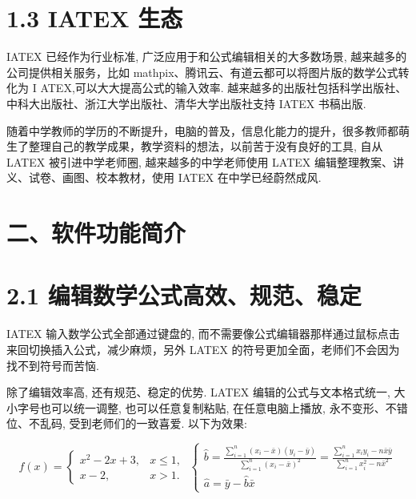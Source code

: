 \documentclass[10pt]{article}
\begin{document}
\section*{1.3 IATEX 生态}

IATEX 已经作为行业标准, 广泛应用于和公式编辑相关的大多数场景, 越来越多的公司提供相关服务，比如 mathpix、腾讯云、有道云都可以将图片版的数学公式转化为 \(\mathrm{I}\) ATEX,可以大大提高公式的输入效率. 越来越多的出版社包括科学出版社、中科大出版社、浙江大学出版社、清华大学出版社支持 IATEX 书稿出版.

随着中学教师的学历的不断提升，电脑的普及，信息化能力的提升，很多教师都萌生了整理自己的教学成果，教学资料的想法，以前苦于没有良好的工具, 自从 LATEX 被引进中学老师圈, 越来越多的中学老师使用 LATEX 编辑整理教案、讲义、试卷、画图、校本教材，使用 IATEX 在中学已经蔚然成风.

\section*{二、软件功能简介}

\section*{2.1 编辑数学公式高效、规范、稳定}

IATEX 输入数学公式全部通过键盘的, 而不需要像公式编辑器那样通过鼠标点击来回切换插入公式，减少麻烦，另外 LATEX 的符号更加全面，老师们不会因为找不到符号而苦恼.

除了编辑效率高, 还有规范、稳定的优势. LATEX 编辑的公式与文本格式统一, 大小字号也可以统一调整, 也可以任意复制粘贴, 在任意电脑上播放, 永不变形、不错位、不乱码, 受到老师们的一致喜爱. 以下为效果:

\[
f\left( x\right)  = \left\{  \begin{array}{ll} {x}^{2} - {2x} + 3, & x \leq  1, \\  x - 2, & x > 1. \end{array}\right. \;\left\{  \begin{array}{l} \widehat{b} = \frac{\mathop{\sum }\limits_{{i = 1}}^{n}\left( {{x}_{i} - \bar{x}}\right) \left( {{y}_{i} - \bar{y}}\right) }{\mathop{\sum }\limits_{{i = 1}}^{n}{\left( {x}_{i} - \bar{x}\right) }^{2}} = \frac{\mathop{\sum }\limits_{{i = 1}}^{n}{x}_{i}{y}_{i} - n\bar{x}\bar{y}}{\mathop{\sum }\limits_{{i = 1}}^{n}{x}_{i}^{2} - n{\bar{x}}^{2}} \\  \widehat{a} = \bar{y} - \widehat{b}\bar{x} \end{array}\right.
\]
\end{document}
